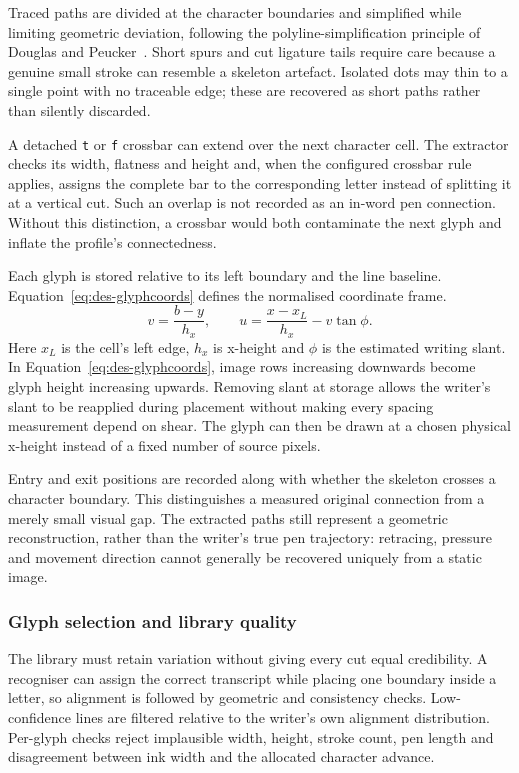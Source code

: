Traced paths are divided at the character boundaries and simplified while limiting geometric deviation, following the polyline-simplification principle of Douglas and Peucker~\cite{douglas1973}. Short spurs and cut ligature tails require care because a genuine small stroke can resemble a skeleton artefact. Isolated dots may thin to a single point with no traceable edge; these are recovered as short paths rather than silently discarded.

A detached \texttt{t} or \texttt{f} crossbar can extend over the next character cell. The extractor checks its width, flatness and height and, when the configured crossbar rule applies, assigns the complete bar to the corresponding letter instead of splitting it at a vertical cut. Such an overlap is not recorded as an in-word pen connection. Without this distinction, a crossbar would both contaminate the next glyph and inflate the profile's connectedness.

Each glyph is stored relative to its left boundary and the line baseline. Equation~\ref{eq:des-glyphcoords} defines the normalised coordinate frame.
\begin{equation}
v=\frac{b-y}{h_x},\qquad
u=\frac{x-x_L}{h_x}-v\tan\phi.
\label{eq:des-glyphcoords}
\end{equation}
Here $x_L$ is the cell's left edge, $h_x$ is x-height and $\phi$ is the estimated writing slant. In Equation~\ref{eq:des-glyphcoords}, image rows increasing downwards become glyph height increasing upwards. Removing slant at storage allows the writer's slant to be reapplied during placement without making every spacing measurement depend on shear. The glyph can then be drawn at a chosen physical x-height instead of a fixed number of source pixels.

Entry and exit positions are recorded along with whether the skeleton crosses a character boundary. This distinguishes a measured original connection from a merely small visual gap. The extracted paths still represent a geometric reconstruction, rather than the writer's true pen trajectory: retracing, pressure and movement direction cannot generally be recovered uniquely from a static image.

\subsubsection{Glyph selection and library quality}
The library must retain variation without giving every cut equal credibility. A recogniser can assign the correct transcript while placing one boundary inside a letter, so alignment is followed by geometric and consistency checks. Low-confidence lines are filtered relative to the writer's own alignment distribution. Per-glyph checks reject implausible width, height, stroke count, pen length and disagreement between ink width and the allocated character advance.

